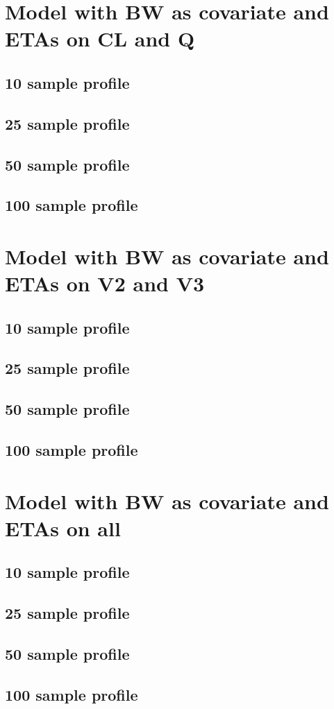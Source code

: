 \section{Model with BW as covariate and ETAs on CL and Q}
\subsection{10 sample profile}
\subsection{25 sample profile}
\subsection{50 sample profile}
\subsection{100 sample profile}


\section{Model with BW as covariate and ETAs on V2 and V3}
\subsection{10 sample profile}
\subsection{25 sample profile}
\subsection{50 sample profile}
\subsection{100 sample profile}


\section{Model with BW as covariate and ETAs on all}
\subsection{10 sample profile}
\subsection{25 sample profile}
\subsection{50 sample profile}
\subsection{100 sample profile}